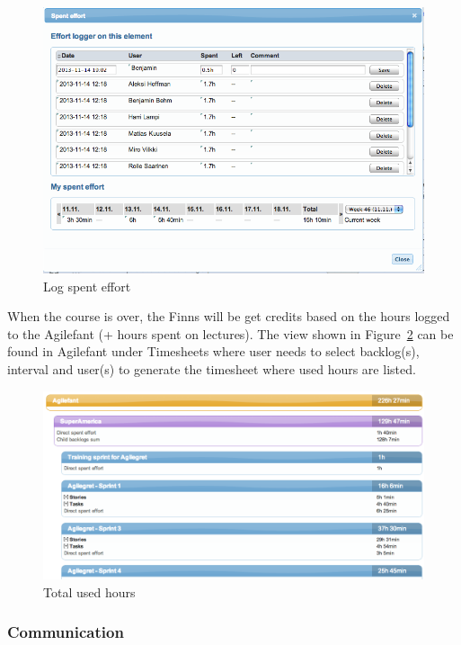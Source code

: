 \begin{figure}[H]
\centering
\includegraphics[width=1\textwidth]{imgs/spenteffort2.png}
\caption{Log spent effort}
\label{fig:spenteffort2}
\end{figure}

When the course is over, the Finns will be get credits based on
the hours logged to the Agilefant (+ hours spent on lectures). The view shown in 
Figure~\ref{fig:totalhours} can be found in Agilefant under Timesheets where
user needs to select backlog(s), interval and user(s) to generate the timesheet where used 
hours are listed.

\begin{figure}[H]
\centering
\includegraphics[width=1\textwidth]{imgs/totalhours.png}
\caption{Total used hours}
\label{fig:totalhours}
\end{figure}

\subsubsection{Communication}

